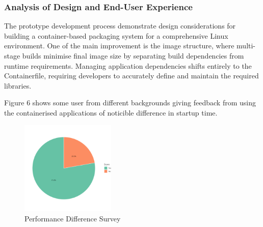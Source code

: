 \documentclass[journal,onecolumn]{IEEEtran}
\begin{document}
\subsubsection{Analysis of Design and End-User Experience}
The prototype development process demonstrate design considerations for building a container-based packaging system for a comprehensive Linux environment. One of the main improvement is the image structure, where multi-stage builds minimise final image size by separating build dependencies from runtime requirements. Managing application dependencies shifts entirely to the Containerfile, requiring developers to accurately define and maintain the required libraries.

Figure 6 shows some user from different backgrounds giving feedback from using the containerised applications of noticible difference in startup time.
\begin{figure}[ht]
    \centering
    \includegraphics[width=0.4\textwidth]{pie_ui2}
    \caption{Performance Difference Survey}
    \label{fig:pi_ui2}
\end{figure}

\newpage
\end{document}
